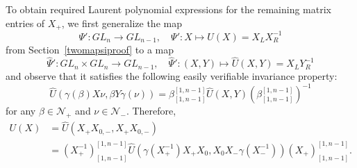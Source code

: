 \documentclass{amsart}
\theoremstyle{definition}
\theoremstyle{remark}
\numberwithin{equation}{section}
\numberwithin{theorem}{section}
\def\N{\mathcal N}
\begin{document}
To obtain  required Laurent polynomial expressions for the remaining matrix entries of $X_+$, we first generalize the map 
$$
\Psi':GL_n \to GL_{n-1} ,\quad  \Psi': X\mapsto U(X)=X_L X^{-1}_R
$$ 
from Section~\ref{twomapsiproof} to a map 
$$
{\widehat\Psi}':GL_n\times GL_n\to GL_{n-1} , \quad  {\widehat\Psi}': (X,Y)\mapsto {\widehat U}(X,Y)=X_L Y^{-1}_R
$$
and observe that it satisfies the following easily verifiable invariance property:
\[
{\widehat U}(\gamma(\beta)X\nu,\beta Y\gamma(\nu))=\beta_{[1,n-1]}^{[1,n-1]}{\widehat U}(X,Y)\left (\beta_{[1,n-1]}^{[1,n-1]}\right )^{-1}
\]
for any $\beta\in\N_+$ and $\nu\in\N_-$. Therefore,
\begin{align}
\label{eq:Ured}
U(X)&={\widehat U}\left (X_+X_{0,-},X_+X_{0,-}\right )\\
\nonumber
&=(X^{-1}_+)_{[1,n-1]}^{[1,n-1]}{\widehat U}\left (\gamma(X^{-1}_+)X_+X_0,X_0X_-\gamma(X_-^{-1}) \right ) (X_+)_{[1,n-1]}^{[1,n-1]}.
\end{align}
\end{document}
